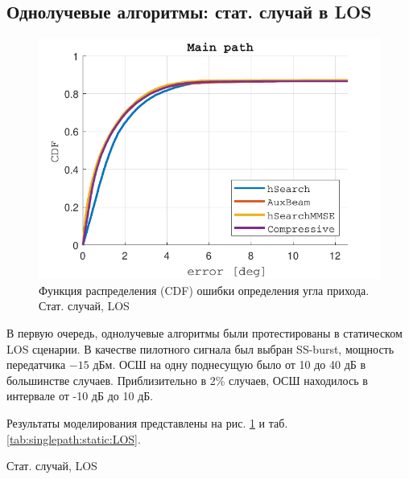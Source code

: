 \subsection{Однолучевые алгоритмы: стат. случай в LOS }


\begin{figure}[ht]
  \centering
  \includegraphics{results/rus/singlepath-static-LOS-1}
  \caption{Функция распределения (CDF) ошибки определения угла прихода. Стат. случай, LOS}
  \label{fig:singlepath:static:LOS}
\end{figure}

В первую очередь, однолучевые алгоритмы были протестированы в статическом LOS сценарии.
В качестве пилотного сигнала был выбран SS-burst, мощность передатчика $-15$ дБм.
ОСШ на одну поднесущую было от 10 до 40 дБ в большинстве случаев.
Приблизительно в 2\% случаев, ОСШ находилось в интервале от -10 дБ до 10 дБ.

Результаты моделирования представлены на рис. \ref{fig:singlepath:static:LOS} и
таб. \ref{tab:singlepath:static:LOS}. 
\begin{table}[h!]
  \begin{center}
    \caption{Стат. случай, LOS}
    \small
    \label{tab:singlepath:static:LOS}
  \end{center}
\end{table}

